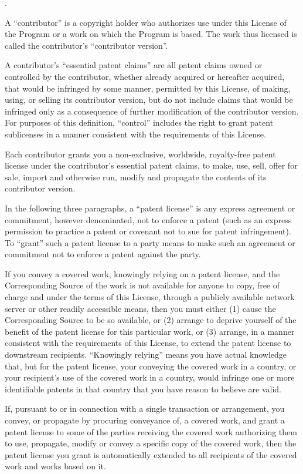 \itemPatents.

A ``contributor'' is a copyright holder who authorizes use under this
License of the Program or a work on which the Program is based.  The
work thus licensed is called the contributor's ``contributor version''.

A contributor's ``essential patent claims'' are all patent claims owned
or controlled by the contributor, whether already acquired or
hereafter acquired, that would be infringed by some manner, permitted
by this License, of making, using, or selling its contributor version,
but do not include claims that would be infringed only as a
consequence of further modification of the contributor version.  For
purposes of this definition, ``control'' includes the right to grant
patent sublicenses in a manner consistent with the requirements of
this License.

Each contributor grants you a non-exclusive, worldwide, royalty-free
patent license under the contributor's essential patent claims, to
make, use, sell, offer for sale, import and otherwise run, modify and
propagate the contents of its contributor version.

In the following three paragraphs, a ``patent license'' is any express
agreement or commitment, however denominated, not to enforce a patent
(such as an express permission to practice a patent or covenant not to
sue for patent infringement).  To ``grant'' such a patent license to a
party means to make such an agreement or commitment not to enforce a
patent against the party.

If you convey a covered work, knowingly relying on a patent license,
and the Corresponding Source of the work is not available for anyone
to copy, free of charge and under the terms of this License, through a
publicly available network server or other readily accessible means,
then you must either (1) cause the Corresponding Source to be so
available, or (2) arrange to deprive yourself of the benefit of the
patent license for this particular work, or (3) arrange, in a manner
consistent with the requirements of this License, to extend the patent
license to downstream recipients.  ``Knowingly relying'' means you have
actual knowledge that, but for the patent license, your conveying the
covered work in a country, or your recipient's use of the covered work
in a country, would infringe one or more identifiable patents in that
country that you have reason to believe are valid.

If, pursuant to or in connection with a single transaction or
arrangement, you convey, or propagate by procuring conveyance of, a
covered work, and grant a patent license to some of the parties
receiving the covered work authorizing them to use, propagate, modify
or convey a specific copy of the covered work, then the patent license
you grant is automatically extended to all recipients of the covered
work and works based on it.

